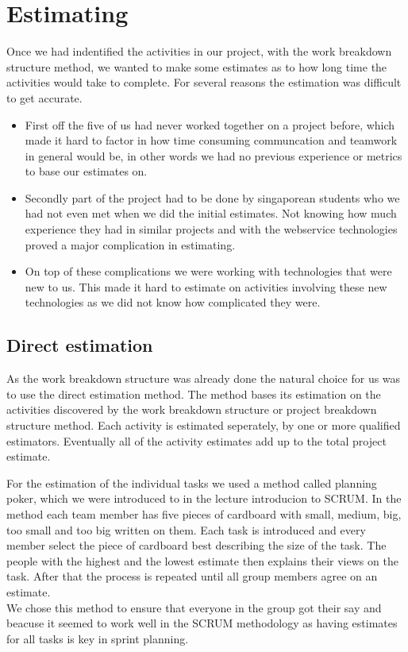 \section{Estimating}
Once we had indentified the activities in our project, with the work breakdown structure method, we wanted to make some estimates as to how long time the activities would take to complete. For several reasons the estimation was difficult to get accurate.
\begin{itemize}
\item First off the five of us had never worked together on a project before, which made it hard to factor in how time consuming communcation and teamwork in general would be, in other words we had no previous experience or metrics to base our estimates on. 

\item Secondly part of the project had to be done by singaporean students who we had not even met when we did the initial estimates. Not knowing how much experience they had in similar projects and with the webservice technologies proved a major complication in estimating.

\item  On top of these complications we were working with technologies that were new to us. This made it hard to estimate on activities involving these new technologies as we did not know how complicated they were.

\end{itemize}
\subsection{Direct estimation}
As the work breakdown structure was already done the natural choice for us was to use the direct estimation method\cite{caye}. The method bases its estimation on the activities discovered by the work breakdown structure or project breakdown structure method. Each activity is  estimated seperately, by one or more qualified estimators. Eventually all of the activity estimates add up to the total project estimate. 

For the estimation of the individual tasks we used a method called planning poker, which we were introduced to in the lecture introducion to SCRUM. In the method each team member has five pieces of cardboard with small, medium, big, too small and too big written on them. Each task is introduced and every member select the piece of cardboard best describing the size of the task. The people with the highest and the lowest estimate then explains their views on the task. After that the process is repeated until all group members agree on an estimate. \\
We chose this method to ensure that everyone in the group got their say and beacuse it seemed to work well in the SCRUM methodology as having estimates for all tasks is key in sprint planning.

